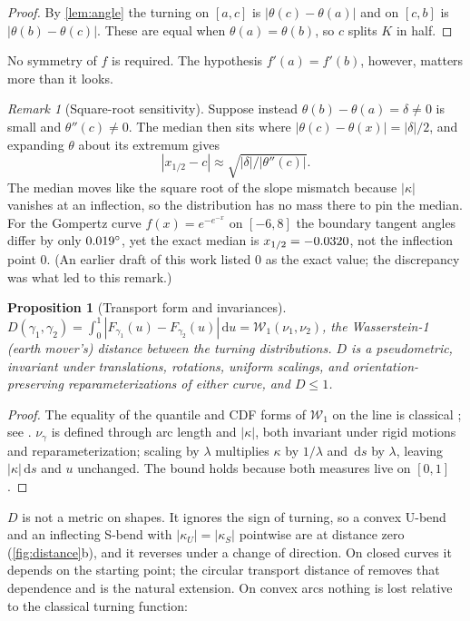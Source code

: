 \documentclass[11pt]{amsart}
\newtheorem{proposition}[theorem]{Proposition}
\theoremstyle{definition}
\theoremstyle{remark}
\newtheorem{remark}[theorem]{Remark}
\newcommand{\dd}{\,\mathrm{d}}
\newcommand{\Wone}{\mathcal{W}_1}
\begin{document}
\begin{proof}
By \cref{lem:angle} the turning on $[a,c]$ is $|\theta(c)-\theta(a)|$ and on $[c,b]$ is $|\theta(b)-\theta(c)|$. These are equal when $\theta(a)=\theta(b)$, so $c$ splits $K$ in half.
\end{proof}

No symmetry of $f$ is required. The hypothesis $f'(a)=f'(b)$, however, matters more than it looks.

\begin{remark}[Square-root sensitivity]\label{rem:sqrt}
Suppose instead $\theta(b)-\theta(a)=\delta\neq0$ is small and $\theta''(c)\neq0$. The median then sits where $|\theta(c)-\theta(x)|=|\delta|/2$, and expanding $\theta$ about its extremum gives
\[
|x_{1/2}-c|\approx\sqrt{|\delta|/|\theta''(c)|}.
\]
The median moves like the square root of the slope mismatch because $|\kappa|$ vanishes at an inflection, so the distribution has no mass there to pin the median. For the Gompertz curve $f(x)=e^{-e^{-x}}$ on $[-6,8]$ the boundary tangent angles differ by only $0.019^\circ$, yet the exact median is $x_{1/2}=-0.0320$, not the inflection point $0$. (An earlier draft of this work listed $0$ as the exact value; the discrepancy was what led to this remark.)
\end{remark}

\begin{proposition}[Transport form and invariances]\label{prop:w1}
$D(\gamma_1,\gamma_2)=\int_0^1|F_{\gamma_1}(u)-F_{\gamma_2}(u)|\dd u=\Wone(\nu_1,\nu_2)$, the Wasserstein-1 (earth mover's) distance between the turning distributions. $D$ is a pseudometric, invariant under translations, rotations, uniform scalings, and orientation-preserving reparameterizations of either curve, and $D\le1$.
\end{proposition}

\begin{proof}
The equality of the quantile and CDF forms of $\Wone$ on the line is classical \cite{vallender1974}; see \cite[Prop.~2.17]{santambrogio2015}. $\nu_\gamma$ is defined through arc length and $|\kappa|$, both invariant under rigid motions and reparameterization; scaling by $\lambda$ multiplies $\kappa$ by $1/\lambda$ and $\dd s$ by $\lambda$, leaving $|\kappa|\dd s$ and $u$ unchanged. The bound holds because both measures live on $[0,1]$.
\end{proof}

$D$ is not a metric on shapes. It ignores the sign of turning, so a convex U-bend and an inflecting S-bend with $|\kappa_U|=|\kappa_S|$ pointwise are at distance zero (\cref{fig:distance}b), and it reverses under a change of direction. On closed curves it depends on the starting point; the circular transport distance of \cite{delon2009circle} removes that dependence and is the natural extension. On convex arcs nothing is lost relative to the classical turning function:
\end{document}
